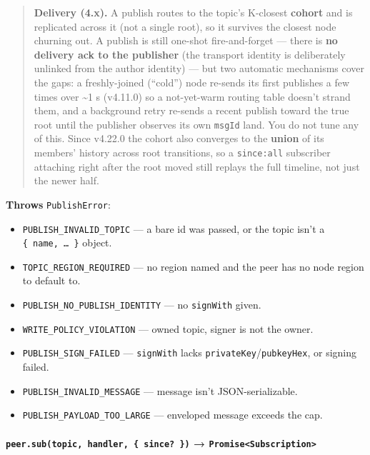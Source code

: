 \documentclass[
  nobib]{tufte-handout}
\providecommand{\tightlist}{%
  \setlength{\itemsep}{0pt}\setlength{\parskip}{0pt}}
\begin{document}
\begin{quote}
\textbf{Delivery (4.x).} A publish routes to the topic's K-closest
\textbf{cohort} and is replicated across it (not a single root), so it
survives the closest node churning out. A publish is still one-shot
fire-and-forget --- there is \textbf{no delivery ack to the publisher}
(the transport identity is deliberately unlinked from the author
identity) --- but two automatic mechanisms cover the gaps: a
freshly-joined (``cold'') node re-sends its first publishes a few times
over \textasciitilde1 s (v4.11.0) so a not-yet-warm routing table
doesn't strand them, and a background retry re-sends a recent publish
toward the true root until the publisher observes its own \texttt{msgId}
land. You do not tune any of this. Since v4.22.0 the cohort also
converges to the \textbf{union} of its members' history across root
transitions, so a \texttt{since:\textquotesingle{}all\textquotesingle{}}
subscriber attaching right after the root moved still replays the full
timeline, not just the newer half.
\end{quote}

\textbf{Throws} \texttt{PublishError}:

\begin{itemize}
\tightlist
\item
  \texttt{PUBLISH\_INVALID\_TOPIC} --- a bare id was passed, or the
  topic isn't a \texttt{\{\ name,\ …\ \}} object.
\item
  \texttt{TOPIC\_REGION\_REQUIRED} --- no region named and the peer has
  no node region to default to.
\item
  \texttt{PUBLISH\_NO\_PUBLISH\_IDENTITY} --- no \texttt{signWith}
  given.
\item
  \texttt{WRITE\_POLICY\_VIOLATION} --- owned topic, signer is not the
  owner.
\item
  \texttt{PUBLISH\_SIGN\_FAILED} --- \texttt{signWith} lacks
  \texttt{privateKey}/\texttt{pubkeyHex}, or signing failed.
\item
  \texttt{PUBLISH\_INVALID\_MESSAGE} --- message isn't
  JSON-serializable.
\item
  \texttt{PUBLISH\_PAYLOAD\_TOO\_LARGE} --- enveloped message exceeds
  the cap.
\end{itemize}

\paragraph{\texorpdfstring{\texttt{peer.sub(topic,\ handler,\ \{\ since?\ \})}
→
\texttt{Promise\textless{}Subscription\textgreater{}}}{peer.sub(topic, handler, \{ since? \}) → Promise\textless Subscription\textgreater{}}}\label{peer.subtopic-handler-since-promisesubscription}
\end{document}
